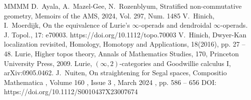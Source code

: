 \documentclass[12pt]{amsart}%
\begin{document}
\begin{thebibliography}{MMMM}
 D.~Ayala, A.~Mazel-Gee, N.~Rozenblyum,
Stratified non-commutative geometry, Memoirs of the AMS, 2024,
Vol. 297, Num. 1485
 V.~Hinich, I.~Moerdijk, On the equivalence of Lurie's 
$\infty$-operads and dendroidal 
$\infty$-operads. J. Topol., 17: e70003. 
https://doi.org/10.1112/topo.70003
 V.~Hinich, Dwyer-Kan localization revisited, Homology, Homotopy and Applications, 18(2016), pp. 27 -- 48.
  Lurie, Higher topos theory, Annals of Mathematics Studies, 170, Princeton University Press, 2009.
  Lurie, $(\infty,2)$-categories and Goodwillie
 calculus I, 	arXiv:0905.0462.
  J.~Nuiten, On straightening for Segal spaces,
Compositio Mathematica , Volume 160 , Issue 3 , March 2024 , pp. 586 -- 656
DOI: https://doi.org/10.1112/S0010437X23007674
 
\end{thebibliography}
\end{document}
